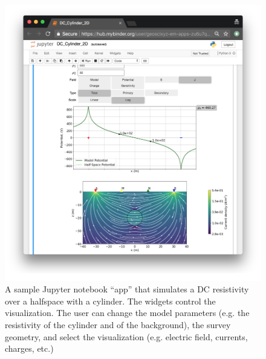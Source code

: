 \begin{figure}
    \begin{center}
    \includegraphics[width=\textwidth]{figures/education/jupyter-app.png}
    \end{center}
\caption{
   A sample Jupyter notebook ``app'' that simulates a DC resistivity over a halfspace
   with a cylinder. The widgets control the visualization. The user can change the model parameters
   (e.g. the resistivity of the cylinder and of the background), the survey geometry, and select the visualization
   (e.g. electric field, currents, charges, etc.)
}
\label{fig:jupyter-app}
\end{figure}



